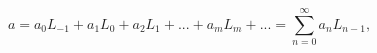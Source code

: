 \begin{equation}\label{epsilon}
a = a_0 L_{-1}+{a_{1}}L_0+ {a_{2}}L_1+...+{a_{m}}L_m+... =
\sum_{n=0}^{\infty}a_nL_{n-1},
\end{equation}

